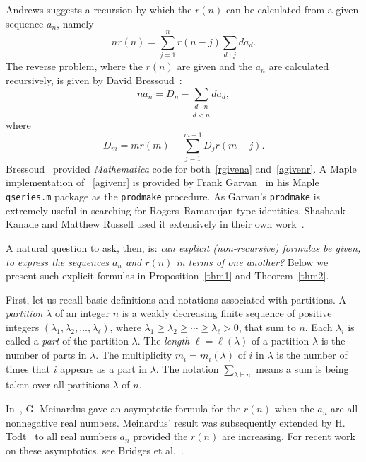 \documentclass[10pt]{article}
\theoremstyle{definition}
\numberwithin{theorem}{section}
\numberwithin{equation}{section}
\begin{document}
 
Andrews suggests a recursion by which the $r(n)$ can be calculated from a given sequence  $a_n$, 
namely
\begin{equation} \label{rgivena}
  n r(n) = \sum_{j=1}^n r(n-j) \sum_{d\mid j} d a_d.
\end{equation}
The reverse problem, where the $r(n)$ are given and the $a_n$ are calculated recursively,
is given by David Bressoud~\cite[p. 61, Ex. 2.3.10]{b99}:
\begin{equation}\label{agivenr}
  n a_n = D_n - \underset{d < n}{\sum_{d \mid n}} d a_d,
\end{equation} 
where \[ D_m = m r(m) -  \sum_{j=1}^{m-1} D_j r(m-j). \]
Bressoud~\cite[Exs. 2.3.8 and 2.3.10 resp.]{b99} provided \emph{Mathematica} code for both~\eqref{rgivena} and~\eqref{agivenr}.
A Maple implementation of ~\eqref{agivenr} is provided by Frank Garvan~\cite{fg20} in his Maple \texttt{qseries.m} package as the
\texttt{prodmake} procedure.  
As Garvan's \texttt{prodmake} is extremely useful in searching for Rogers--Ramanujan
type identities, Shashank Kanade and Matthew Russell used it extensively in their
own work~\cite{kr15}.

A natural question to ask, then, is:  {\it can explicit (non-recursive) formulas be given, to express the sequences $a_n$ and $r(n)$ in terms of one another?} Below we present such explicit formulas in Proposition~\ref{thm1} and Theorem~\ref{thm2}.


First, let us recall   basic definitions and notations associated with partitions.
A \emph{partition} $\lambda$ of an integer $n$ is a weakly decreasing finite 
sequence of positive integers $(\lambda_1, \lambda_2, \dots, \lambda_\ell)$, where
$\lambda_1 \geq \lambda_2 \geq \cdots \geq \lambda_\ell > 0$, that sum to $n$.
Each $\lambda_i$ is called a \emph{part} of the partition $\lambda$.  The
\emph{length} $\ell = \ell(\lambda)$ of a partition $\lambda$ is the number of parts in $\lambda$.
The multiplicity $m_i = m_i(\lambda)$ of $i$ in $\lambda$ is the number of times that $i$ 
appears as a part in $\lambda$.   The notation  $\sum_{\lambda\vdash n}$ means a sum is being taken over all partitions $\lambda$ of
 $n$.

In~\cite{gm54}, G. Meinardus gave an asymptotic formula for the $r(n)$ when the
$a_n$ are all nonnegative real numbers.  
Meinardus' result was subsequently extended by H. Todt~\cite{ht11} 
to all real numbers $a_n$ provided
the $r(n)$ are increasing.   
For recent work on these asymptotics, see Bridges et al.~\cite{bbbf24}.
\end{document}
